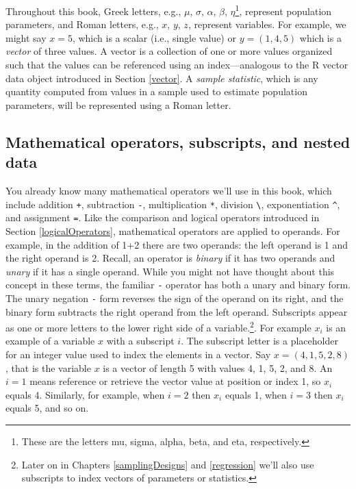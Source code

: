\documentclass[
  11pt,
]{krantz}
\theoremstyle{definition}
\theoremstyle{definition}
\theoremstyle{definition}
\theoremstyle{definition}
\theoremstyle{remark}
\begin{document}
Throughout this book, Greek letters, e.g., \(\mu\), \(\sigma\), \(\alpha\), \(\beta\), \(\eta\)\footnote{These are the letters mu, sigma, alpha, beta, and eta, respectively.}, represent population parameters, and Roman letters, e.g., \(x\), \(y\), \(z\), represent variables. For example, we might say \(x=5\), which is a scalar (i.e., single value) or \(y=(1,4,5)\) which is a \emph{vector} of three values. A vector is a collection of one or more values organized such that the values can be referenced using an index---analogous to the R vector data object introduced in Section \ref{vector}. A \emph{sample statistic}, which is any quantity computed from values in a sample used to estimate population parameters, will be represented using a Roman letter.

\hypertarget{operators}{%
\subsection{Mathematical operators, subscripts, and nested data}\label{operators}}

You already know many mathematical operators we'll use in this book, which include addition \texttt{+}, subtraction \texttt{-}, multiplication \texttt{*}, division \texttt{\textbackslash{}}, exponentiation \texttt{\^{}}, and assignment \texttt{=}. Like the comparison and logical operators introduced in Section \ref{logicalOperators}, mathematical operators are applied to operands. For example, in the addition of 1+2 there are two operands: the left operand is 1 and the right operand is 2. Recall, an operator is \emph{binary} if it has two operands and \emph{unary} if it has a single operand. While you might not have thought about this concept in these terms, the familiar \texttt{-} operator has both a unary and binary form. The unary negation \texttt{-} form reverses the sign of the operand on its right, and the binary form subtracts the right operand from the left operand.
Subscripts appear as one or more letters to the lower right side of a variable.\footnote{Later on in Chapters \ref{samplingDesigns} and \ref{regression} we'll also use subscripts to index vectors of parameters or statistics.}. For example \(x_{i}\) is an example of a variable \(x\) with a subscript \(i\). The subscript letter is a placeholder for an integer value used to index the elements in a vector. Say \(x=(4,1,5,2,8)\), that is the variable \(x\) is a vector of length 5 with values 4, 1, 5, 2, and 8. An \(i = 1\) means reference or retrieve the vector value at position or index 1, so \(x_i\) equals 4. Similarly, for example, when \(i = 2\) then \(x_i\) equals 1, when \(i = 3\) then \(x_i\) equals 5, and so on.
\end{document}
